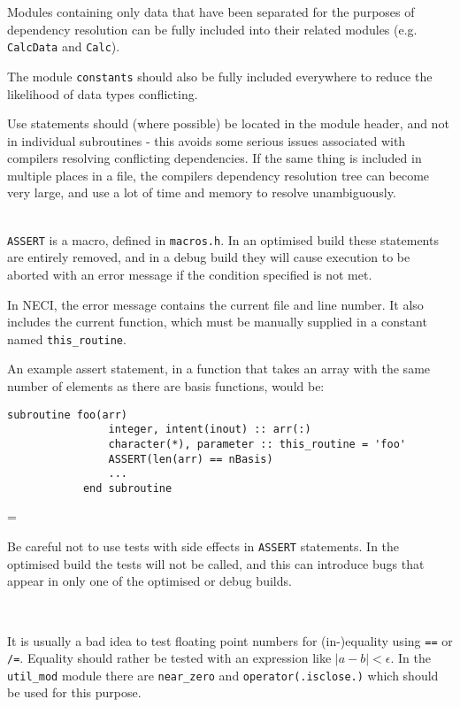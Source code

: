 \documentclass[a4paper,notitlepage]{scrreprt}
\newcommand\headitem[1]{\needspace{1.5\baselineskip}\item[{\boldmath #1 \nopagebreak}] \hfill \\ \nopagebreak}
\let\code\lstinline
\newenvironment{warningbox}
	{\par\begin{mdframed}[%
		linewidth = 2pt, %
	    linecolor = red, %
	    roundcorner = 6pt, %
		backgroundcolor = gray!20
	]\begin{list}{}{\leftmargin=1cm
			           \labelwidth=\leftmargin}\item[\Large\ding{43}]}
	{\end{list}\end{mdframed}\par}
\begin{document}
\begin{description}
		Modules containing only data that have been separated for the purposes
		of dependency resolution can be fully included into their related
		modules (e.g. \code{CalcData} and \code{Calc}).

		The module \code{constants} should also be fully included
		everywhere to reduce the likelihood of data types conflicting.

		Use statements should
		(where possible) be located in the module header, and not in
		individual subroutines - this avoids some serious issues associated
		with compilers resolving conflicting dependencies. If the same thing
		is included in multiple places in a file, the compilers dependency
		resolution tree can become very large, and use a lot of time and
		memory to resolve unambiguously.


	\headitem{{\ttfamily ASSERT} statements}
		\code{ASSERT} is a macro, defined in \code{macros.h}. In
		an optimised build these statements are entirely removed, and in a
		debug build they will cause execution to be aborted with an error
		message if the condition specified is not met.

		In NECI, the error message contains the current file and line number.
		It also includes the current function, which must be manually supplied
		in a constant named \code{this_routine}.

		An example assert statement, in a function that takes an array with
		the same number of elements as there are basis functions, would be:
		\begin{lstlisting}[gobble=8]
			subroutine foo(arr)
				integer, intent(inout) :: arr(:)
				character(*), parameter :: this_routine = 'foo'
				ASSERT(len(arr) == nBasis)
				...
			end subroutine
		\end{lstlisting}

		\begin{warningbox}
			Be careful not to use tests with side effects in \code{ASSERT}
			statements. In the optimised build the tests will not be called,
			and this can introduce bugs that appear in only one of the
			optimised or debug builds.
		\end{warningbox}

	\headitem{Floating point comparison and integer division}

    It is usually a bad idea to test floating point numbers
    for (in-)equality using \code{==} or \code{/=}.
    Equality should rather be tested with an expression like
    $ |a - b| < \epsilon$.
    In the \code{util_mod} module there are \code{near_zero}
    and \code{operator(.isclose.)} which should be used for this purpose.


\end{description}
\end{document}
